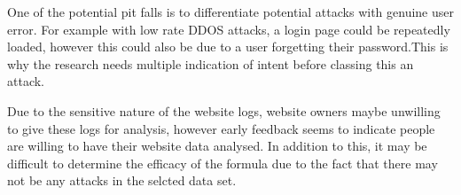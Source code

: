 One of the potential pit falls is to differentiate potential attacks with genuine user error. For example with low rate DDOS attacks, a login page could be repeatedly loaded, however this could also be due to a user forgetting their password.This is why the research needs multiple indication of intent before classing this an attack.  

Due to the sensitive nature of the website logs, website owners maybe unwilling to give these logs for analysis, however early feedback seems to indicate people are willing to have their website data analysed. In addition to this, it may be difficult to determine the efficacy of the formula due to the fact that there may not be any attacks in the selcted data set.


